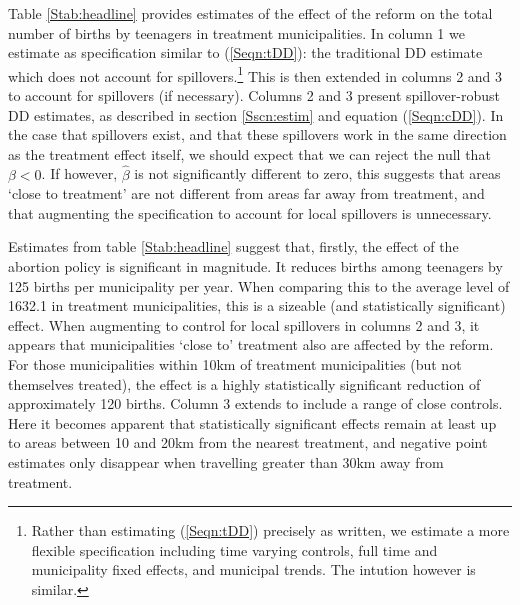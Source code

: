 \documentclass{article}
\begin{document}
\begin{spacing}{1.1}
Table \ref{Stab:headline} provides estimates of the effect of the reform on
the total number of births by teenagers in treatment municipalities.  In 
column 1 we estimate as specification similar to (\ref{Seqn:tDD}): the 
traditional DD estimate which does not account for spillovers.\footnote{Rather 
than estimating (\ref{Seqn:tDD}) precisely as written, we estimate a more 
flexible specification including time varying controls, full time and
municipality fixed effects, and municipal trends.  The intution however is
similar.}  This is then extended in columns 2 and 3 to account for spillovers
(if necessary).  Columns 2 and 3 present spillover-robust DD estimates, as 
described in section \ref{Sscn:estim} and equation (\ref{Seqn:cDD}).  In the
case that spillovers exist, and that these spillovers work in the same 
direction as the treatment effect itself, we should expect that we can reject
the null that $\beta<0$.  If however, $\hat\beta$ is not significantly 
different to zero, this suggests that areas `close to treatment' are not
different from areas far away from treatment, and that augmenting the 
specification to account for local spillovers is unnecessary.



Estimates from table \ref{Stab:headline} suggest that, firstly, the effect of
the abortion policy is significant in magnitude.  It reduces births among 
teenagers by 125 births per municipality per year. When comparing this to the
average level of 1632.1 in treatment municipalities, this is a sizeable (and
statistically significant) effect.  When augmenting to control for local
spillovers in columns 2 and 3, it appears that municipalities `close to' 
treatment also are affected by the reform.  For those municipalities within
10km of treatment municipalities (but not themselves treated), the effect is 
a highly statistically significant reduction of approximately 120 births.
Column 3 extends to include a range of close controls.  Here it becomes
apparent that statistically significant effects remain at least up to areas
between 10 and 20km from the nearest treatment, and negative point estimates
only disappear when travelling greater than 30km away from treatment.


\end{spacing}
\end{document}
